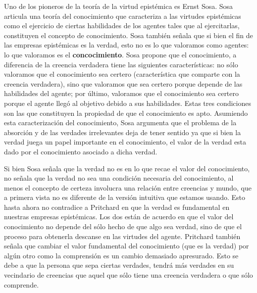 \documentclass{article}
\begin{document}
Uno de los pioneros de la teoría de la virtud epistémica es Ernst Sosa. Sosa \citeyear{Sosa2017-SOSE} articula una teoría del conocimiento que caracteriza a las virtudes epistémicas como el ejercicio de ciertas habilidades de los agentes tales que al ejercitarlas, constituyen el concepto de conocimiento. Sosa también señala que si bien el fin de las empresas epistémicas es la verdad, esto no es lo que valoramos como agentes: lo que valoramos es el \textbf{concocimiento}. Sosa \citeyear[pp. 11-113]{Sosa2017-SOSE} propone que el conocimiento, a diferencia de la creencia verdadera tiene las siguientes características: no sólo valoramos que el conocimiento sea certero (característica que comparte con la creencia verdadera), sino que valoramos que sea certero porque depende de las habilidades del agente; por último, valoramos que el conocimiento sea certero porque el agente llegó al objetivo debido a sus habilidades. Estas tres condiciones son las que constituyen la propiedad de que el conocimiento es apto. Asumiendo esta caracterización del conocimiento, Sosa argumenta que el problema de la absorción y de las verdades irrelevantes deja de tener sentido ya que si bien la verdad juega un papel importante en el conocimiento, el valor de la verdad esta dado por el conocimiento asociado a dicha verdad.

Si bien Sosa señala que la verdad no es en lo que recae el valor del conocimiento, no señala que la verdad no sea una condición necesaria del conocimiento, al menos el concepto de certeza involucra una relación entre creencias y mundo, que a primera vista no es diferente de la versión intuitiva que estamos usando. Esto hasta ahora no contradice a Pritchard en que la verdad es fundamental en nuestras empresas epistémicas. Los dos están de acuerdo en que el valor del conocimiento no depende del sólo hecho de que algo sea verdad, sino de que el proceso para obtenerla descanse en las virtudes del agente. Pritchard también señala que cambiar el valor fundamental del conocimiento (que es la verdad) por algún otro como la comprensión es un cambio demasiado apresurado. Esto se debe a que la persona que sepa ciertas verdades, tendrá más verdades en su vecindario de creencias que aquel que sólo tiene una creencia verdadera o que sólo comprende.
\end{document}
